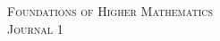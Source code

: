 \documentclass{article}
\newcommand{\classname}{
Foundations of Higher Mathematics
}
\newcommand{\journal}{
1
}
\begin{document}
\begin{center}
\textsc{\Large \classname}\\[.3cm]
\textsc{\Large Journal \journal}\\[1cm]
\end{center}

\lipsum[1-6]
\end{document}
